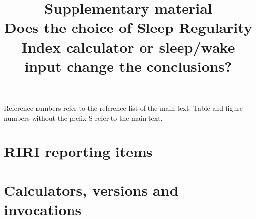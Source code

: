\documentclass[12pt]{article}
\title{\bfseries Supplementary material\\[4pt]\large Does the choice of Sleep Regularity Index calculator or sleep/wake input change the conclusions?}
\author{}\date{}
\begin{document}
\maketitle
\renewcommand{\thetable}{S\arabic{table}}\renewcommand{\thefigure}{S\arabic{figure}}
\noindent Reference numbers refer to the reference list of the main text. Table and figure numbers without the prefix S refer to the main text.

\section{RIRI reporting items}


\section{Calculators, versions and invocations}
\label{sec:S_versions}
\end{document}
